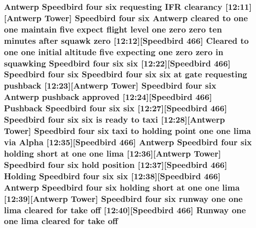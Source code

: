 \subsubsection[{\texorpdfstring{off}{off}}]{\setlength{\rightskip}{0pt plus 5cm}Antwerp Speedbird four {\bf six} requesting I\+FR clearancy \mbox{[}12\+:11\mbox{]}\mbox{[}Antwerp {\bf Tower}\mbox{]} Speedbird four {\bf six} Antwerp cleared to {\bf one} {\bf one} maintain five expect flight level {\bf one} {\bf zero} {\bf zero} {\bf ten} minutes after squawk {\bf zero} \mbox{[}12\+:12\mbox{]}\mbox{[}Speedbird 466\mbox{]} Cleared to {\bf one} {\bf one} initial altitude five expecting {\bf one} {\bf zero} {\bf zero} in {\bf squawking} Speedbird four {\bf six} {\bf six} \mbox{[}12\+:22\mbox{]}\mbox{[}Speedbird 466\mbox{]} Speedbird four {\bf six} Speedbird four {\bf six} {\bf six} at gate requesting pushback \mbox{[}12\+:23\mbox{]}\mbox{[}Antwerp {\bf Tower}\mbox{]} Speedbird four {\bf six} Antwerp pushback {\bf approved} \mbox{[}12\+:24\mbox{]}\mbox{[}Speedbird 466\mbox{]} Pushback Speedbird four {\bf six} {\bf six} \mbox{[}12\+:27\mbox{]}\mbox{[}Speedbird 466\mbox{]} Speedbird four {\bf six} {\bf six} is ready to taxi \mbox{[}12\+:28\mbox{]}\mbox{[}Antwerp {\bf Tower}\mbox{]} Speedbird four {\bf six} taxi to holding point {\bf one} {\bf one} {\bf lima} via {\bf Alpha} \mbox{[}12\+:35\mbox{]}\mbox{[}Speedbird 466\mbox{]} Antwerp Speedbird four {\bf six} holding short at {\bf one} {\bf one} {\bf lima} \mbox{[}12\+:36\mbox{]}\mbox{[}Antwerp {\bf Tower}\mbox{]} Speedbird four {\bf six} hold {\bf position} \mbox{[}12\+:37\mbox{]}\mbox{[}Speedbird 466\mbox{]} Holding Speedbird four {\bf six} {\bf six} \mbox{[}12\+:38\mbox{]}\mbox{[}Speedbird 466\mbox{]} Antwerp Speedbird four {\bf six} holding short at {\bf one} {\bf one} {\bf lima} \mbox{[}12\+:39\mbox{]}\mbox{[}Antwerp {\bf Tower}\mbox{]} Speedbird four {\bf six} runway {\bf one} {\bf one} {\bf lima} cleared for take off \mbox{[}12\+:40\mbox{]}\mbox{[}Speedbird 466\mbox{]} {\bf Runway} {\bf one} {\bf one} {\bf lima} cleared for take off}\hypertarget{happyDay5ATC_8txt_a7b8077b12b6ec60aa98491cebd72fdca}{}\label{happyDay5ATC_8txt_a7b8077b12b6ec60aa98491cebd72fdca}
